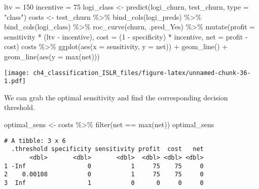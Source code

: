 \documentclass[
]{article}
\newenvironment{Shaded}{\begin{snugshade}}{\end{snugshade}}
\newcommand{\AttributeTok}[1]{\textcolor[rgb]{0.77,0.63,0.00}{#1}}
\newcommand{\DecValTok}[1]{\textcolor[rgb]{0.00,0.00,0.81}{#1}}
\newcommand{\FunctionTok}[1]{\textcolor[rgb]{0.00,0.00,0.00}{#1}}
\newcommand{\NormalTok}[1]{#1}
\newcommand{\OtherTok}[1]{\textcolor[rgb]{0.56,0.35,0.01}{#1}}
\newcommand{\SpecialCharTok}[1]{\textcolor[rgb]{0.00,0.00,0.00}{#1}}
\newcommand{\StringTok}[1]{\textcolor[rgb]{0.31,0.60,0.02}{#1}}
\begin{document}
\begin{Shaded}
\begin{Highlighting}[]
\NormalTok{ltv }\OtherTok{=} \DecValTok{150}
\NormalTok{incentive }\OtherTok{=} \DecValTok{75}
\NormalTok{logi\_class }\OtherTok{\textless{}{-}} \FunctionTok{predict}\NormalTok{(logi\_churn, test\_churn, }\AttributeTok{type =} \StringTok{"class"}\NormalTok{)}
\NormalTok{costs }\OtherTok{\textless{}{-}}\NormalTok{ test\_churn }\SpecialCharTok{\%\textgreater{}\%}
  \FunctionTok{bind\_cols}\NormalTok{(logi\_preds) }\SpecialCharTok{\%\textgreater{}\%}
  \FunctionTok{bind\_cols}\NormalTok{(logi\_class) }\SpecialCharTok{\%\textgreater{}\%}
  \FunctionTok{roc\_curve}\NormalTok{(churn, .pred\_Yes) }\SpecialCharTok{\%\textgreater{}\%}
  \FunctionTok{mutate}\NormalTok{(}\AttributeTok{profit  =}\NormalTok{ sensitivity }\SpecialCharTok{*}\NormalTok{ (ltv }\SpecialCharTok{{-}}\NormalTok{ incentive),}
         \AttributeTok{cost =}\NormalTok{ (}\DecValTok{1} \SpecialCharTok{{-}}\NormalTok{ specificity) }\SpecialCharTok{*}\NormalTok{ incentive,}
         \AttributeTok{net =}\NormalTok{ profit }\SpecialCharTok{{-}}\NormalTok{ cost)}
\NormalTok{costs }\SpecialCharTok{\%\textgreater{}\%}
  \FunctionTok{ggplot}\NormalTok{(}\FunctionTok{aes}\NormalTok{(}\AttributeTok{x =}\NormalTok{ sensitivity, }\AttributeTok{y =}\NormalTok{ net)) }\SpecialCharTok{+}
  \FunctionTok{geom\_line}\NormalTok{() }\SpecialCharTok{+}
  \FunctionTok{geom\_line}\NormalTok{(}\FunctionTok{aes}\NormalTok{(}\AttributeTok{y =} \FunctionTok{max}\NormalTok{(net)))}
\end{Highlighting}
\end{Shaded}

\texttt{[image: ch4\_classification\_ISLR\_files/figure-latex/unnamed-chunk-36-1.pdf]}

We can grab the optimal sensitivity and find the corresponding decision
threshold.

\begin{Shaded}
\begin{Highlighting}[]
\NormalTok{optimal\_sens }\OtherTok{\textless{}{-}}\NormalTok{ costs }\SpecialCharTok{\%\textgreater{}\%}
  \FunctionTok{filter}\NormalTok{(net }\SpecialCharTok{==} \FunctionTok{max}\NormalTok{(net))}
\NormalTok{optimal\_sens}
\end{Highlighting}
\end{Shaded}

\begin{verbatim}
# A tibble: 3 x 6
  .threshold specificity sensitivity profit  cost   net
       <dbl>       <dbl>       <dbl>  <dbl> <dbl> <dbl>
1 -Inf                 0           1     75    75     0
2    0.00108           0           1     75    75     0
3  Inf                 1           0      0     0     0
\end{verbatim}
\end{document}
